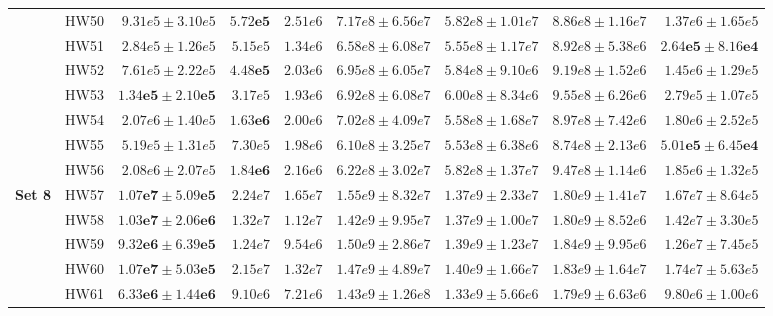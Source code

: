 \documentclass[11pt]{article}
\begin{document}
{\begin{table}
\begin{tabular}{l|r|r|r|r|r|r|r|r}
& HW50 & $9.31e5 \pm 3.10e5$ & $\mathbf{5.72e5}$ & $2.51e6$
& $7.17e8 \pm 6.56e7$
& $5.82e8 \pm 1.01e7$
& $8.86e8 \pm 1.16e7$
& $1.37e6 \pm 1.65e5$ \\

& HW51 & $2.84e5 \pm 1.26e5$ & $5.15e5$ & $1.34e6$
& $6.58e8 \pm 6.08e7$
& $5.55e8 \pm 1.17e7$
& $8.92e8 \pm 5.38e6$
& $\mathbf{2.64e5 \pm 8.16e4}$ \\

& HW52 & $7.61e5 \pm 2.22e5$ & $\mathbf{4.48e5}$ & $2.03e6$
& $6.95e8 \pm 6.05e7$
& $5.84e8 \pm 9.10e6$
& $9.19e8 \pm 1.52e6$
& $1.45e6 \pm 1.29e5$ \\

& HW53 & $\mathbf{1.34e5 \pm 2.10e5}$ & $3.17e5$ & $1.93e6$
& $6.92e8 \pm 6.08e7$
& $6.00e8 \pm 8.34e6$
& $9.55e8 \pm 6.26e6$
& $2.79e5 \pm 1.07e5$ \\

& HW54 & $2.07e6 \pm 1.40e5$ & $\mathbf{1.63e6}$ & $2.00e6$
& $7.02e8 \pm 4.09e7$
& $5.58e8 \pm 1.68e7$
& $8.97e8 \pm 7.42e6$
& $1.80e6 \pm 2.52e5$ \\

& HW55 & $5.19e5 \pm 1.31e5$ & $7.30e5$ & $1.98e6$
& $6.10e8 \pm 3.25e7$
& $5.53e8 \pm 6.38e6$
& $8.74e8 \pm 2.13e6$
& $\mathbf{5.01e5 \pm 6.45e4}$ \\

& HW56 & $2.08e6 \pm 2.07e5$ & $\mathbf{1.84e6}$ & $2.16e6$
& $6.22e8 \pm 3.02e7$
& $5.82e8 \pm 1.37e7$
& $9.47e8 \pm 1.14e6$
& $1.85e6 \pm 1.32e5$ \\
\hline

\multirow{8}{*}{\textbf{Set 8}}
& HW57 & $\mathbf{1.07e7 \pm 5.09e5}$ & $2.24e7$ & $1.65e7$
& $1.55e9 \pm 8.32e7$
& $1.37e9 \pm 2.33e7$
& $1.80e9 \pm 1.41e7$
& $1.67e7 \pm 8.64e5$ \\

& HW58 & $\mathbf{1.03e7 \pm 2.06e6}$ & $1.32e7$ & $1.12e7$
& $1.42e9 \pm 9.95e7$
& $1.37e9 \pm 1.00e7$
& $1.80e9 \pm 8.52e6$
& $1.42e7 \pm 3.30e5$ \\

& HW59 & $\mathbf{9.32e6 \pm 6.39e5}$ & $1.24e7$ & $9.54e6$
& $1.50e9 \pm 2.86e7$
& $1.39e9 \pm 1.23e7$
& $1.84e9 \pm 9.95e6$
& $1.26e7 \pm 7.45e5$ \\

& HW60 & $\mathbf{1.07e7 \pm 5.03e5}$ & $2.15e7$ & $1.32e7$
& $1.47e9 \pm 4.89e7$
& $1.40e9 \pm 1.66e7$
& $1.83e9 \pm 1.64e7$
& $1.74e7 \pm 5.63e5$ \\

& HW61 & $\mathbf{6.33e6 \pm 1.44e6}$ & $9.10e6$ & $7.21e6$
& $1.43e9 \pm 1.26e8$
& $1.33e9 \pm 5.66e6$
& $1.79e9 \pm 6.63e6$
& $9.80e6 \pm 1.00e6$ \\


\end{tabular}
\end{table}}
\end{document}
